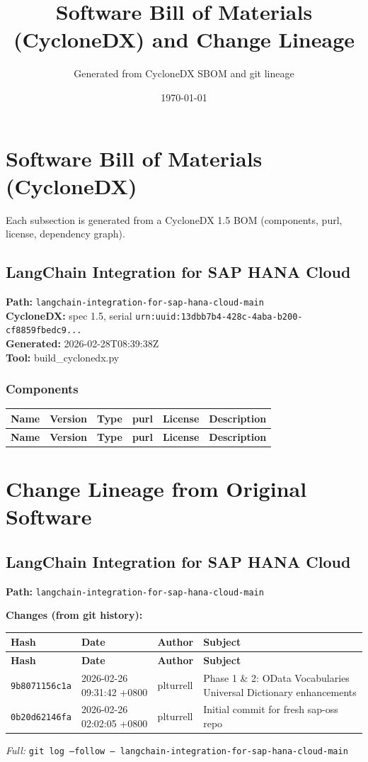 \documentclass[11pt]{article}
\title{Software Bill of Materials (CycloneDX) and Change Lineage}
\author{Generated from CycloneDX SBOM and git lineage}
\date{\today}
\begin{document}
\maketitle
\tableofcontents
\newpage
\section{Software Bill of Materials (CycloneDX)}
Each subsection is generated from a CycloneDX 1.5 BOM (components, purl, license, dependency graph).

\subsection{LangChain Integration for SAP HANA Cloud}
\textbf{Path:} \texttt{langchain-integration-for-sap-hana-cloud-main}
\\ \textbf{CycloneDX:} spec 1.5, serial \texttt{urn:uuid:13dbb7b4-428c-4aba-b200-cf8859fbedc9...}
\\ \textbf{Generated:} 2026-02-28T08:39:38Z
\\ \textbf{Tool:} build\_cyclonedx.py

\subsubsection*{Components}
\begin{longtable}{|l|l|l|p{2.2cm}|l|p{4cm}|}
\hline
\textbf{Name} & \textbf{Version} & \textbf{Type} & \textbf{purl} & \textbf{License} & \textbf{Description} \\
\hline
\endfirsthead
\hline
\textbf{Name} & \textbf{Version} & \textbf{Type} & \textbf{purl} & \textbf{License} & \textbf{Description} \\
\hline
\endhead
\hline
\end{longtable}

\newpage
\section{Change Lineage from Original Software}

\subsection{LangChain Integration for SAP HANA Cloud}
\textbf{Path:} \texttt{langchain-integration-for-sap-hana-cloud-main}

\textbf{Changes (from git history):}
\begin{longtable}{|p{2.2cm}|p{3.2cm}|l|p{6cm}|}
\hline \textbf{Hash} & \textbf{Date} & \textbf{Author} & \textbf{Subject} \\ \hline \endfirsthead
\hline \textbf{Hash} & \textbf{Date} & \textbf{Author} & \textbf{Subject} \\ \hline \endhead
\texttt{9b8071156c1a} & 2026-02-26 09:31:42 +0800 & plturrell & Phase 1 \& 2: OData Vocabularies Universal Dictionary enhancements \\
\texttt{0b20d62146fa} & 2026-02-26 02:02:05 +0800 & plturrell & Initial commit for fresh sap-oss repo \\
\hline
\end{longtable}
\textit{Full:} \texttt{git log --follow -- langchain-integration-for-sap-hana-cloud-main}
\end{document}
